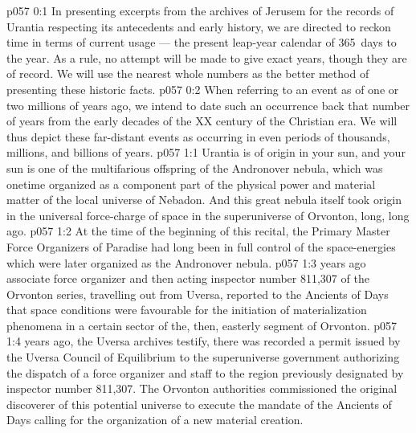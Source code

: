 \author{Life Carrier}
\vs p057 0:1 In presenting excerpts from the archives of Jerusem for the records of Urantia respecting its antecedents and early history, we are directed to reckon time in terms of current usage --- the present leap\hyp{}year calendar of 365\, days to the year. As a rule, no attempt will be made to give exact years, though they are of record. We will use the nearest whole numbers as the better method of presenting these historic facts.
\vs p057 0:2 When referring to an event as of one or two millions of years ago, we intend to date such an occurrence back that number of years from the early decades of the XX century of the Christian era. We will thus depict these far\hyp{}distant events as occurring in even periods of thousands, millions, and billions of years.
\vs p057 1:1 Urantia is of origin in your sun, and your sun is one of the multifarious offspring of the Andronover nebula, which was onetime organized as a component part of the physical power and material matter of the local universe of Nebadon. And this great nebula itself took origin in the universal force\hyp{}charge of space in the superuniverse of Orvonton, long, long ago.
\vs p057 1:2 At the time of the beginning of this recital, the Primary Master Force Organizers of Paradise had long been in full control of the space\hyp{}energies which were later organized as the Andronover nebula.
\vs p057 1:3 \pc {} years ago associate force organizer and then acting inspector number 811,307 of the Orvonton series, travelling out from Uversa, reported to the Ancients of Days that space conditions were favourable for the initiation of materialization phenomena in a certain sector of the, then, easterly segment of Orvonton.
\vs p057 1:4 \pc {} years ago, the Uversa archives testify, there was recorded a permit issued by the Uversa Council of Equilibrium to the superuniverse government authorizing the dispatch of a force organizer and staff to the region previously designated by inspector number 811,307. The Orvonton authorities commissioned the original discoverer of this potential universe to execute the mandate of the Ancients of Days calling for the organization of a new material creation.

